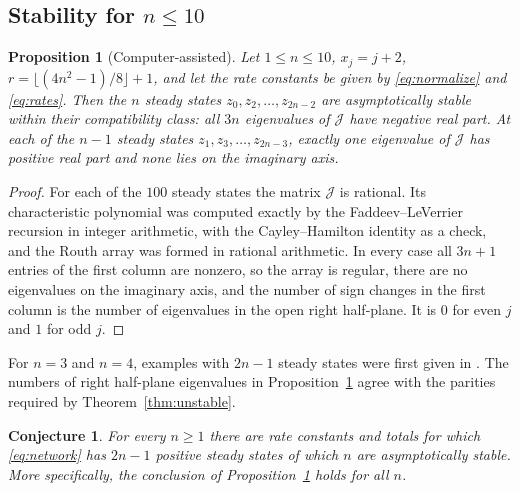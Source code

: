 \documentclass[11pt]{article}
\theoremstyle{plain}
\newtheorem{proposition}[theorem]{Proposition}
\newtheorem{conjecture}[theorem]{Conjecture}
\theoremstyle{definition}
\theoremstyle{remark}
\numberwithin{equation}{section}
\newcommand{\JS}{\mathcal J}
\begin{document}
\subsection{Stability for \texorpdfstring{\(n\le10\)}{n at most 10}}
\begin{proposition}[Computer-assisted]\label{prop:census}
Let \(1\le n\le10\), \(x_j=j+2\), \(r=\lfloor(4n^2-1)/8\rfloor+1\), and let the rate constants
be given by \eqref{eq:normalize} and \eqref{eq:rates}. Then the \(n\) steady states
\(z_0,z_2,\dots,z_{2n-2}\) are asymptotically stable within their compatibility class: all
\(3n\) eigenvalues of \(\JS\) have negative real part. At each of the \(n-1\) steady states
\(z_1,z_3,\dots,z_{2n-3}\), exactly one eigenvalue of \(\JS\) has positive real part and none
lies on the imaginary axis.
\end{proposition}
\begin{proof}
For each of the \(100\) steady states the matrix \(\JS\) is rational. Its characteristic
polynomial was computed exactly by the Faddeev--LeVerrier recursion in integer arithmetic,
with the Cayley--Hamilton identity as a check, and the Routh array \cite[Ch.~XV]{Gantmacher}
was formed in rational arithmetic. In every case all \(3n+1\) entries of the first column are
nonzero, so the array is regular, there are no eigenvalues on the imaginary axis, and the
number of sign changes in the first column is the number of eigenvalues in the open right
half-plane. It is \(0\) for even \(j\) and \(1\) for odd \(j\).
\end{proof}

For \(n=3\) and \(n=4\), examples with \(2n-1\) steady states were first given in
\cite{FHC2014}. The numbers of right half-plane eigenvalues in Proposition~\ref{prop:census}
agree with the parities required by Theorem~\ref{thm:unstable}.

\begin{conjecture}\label{conj:stable}
For every \(n\ge1\) there are rate constants and totals for which \eqref{eq:network} has
\(2n-1\) positive steady states of which \(n\) are asymptotically stable. More specifically,
the conclusion of Proposition~\ref{prop:census} holds for all \(n\).
\end{conjecture}
\end{document}
